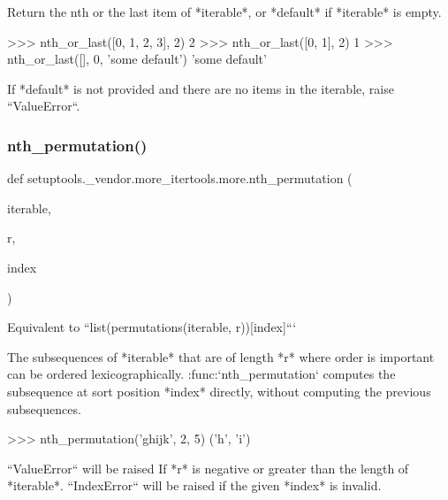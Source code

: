 \begin{DoxyVerb}Return the nth or the last item of *iterable*,
or *default* if *iterable* is empty.

    >>> nth_or_last([0, 1, 2, 3], 2)
    2
    >>> nth_or_last([0, 1], 2)
    1
    >>> nth_or_last([], 0, 'some default')
    'some default'

If *default* is not provided and there are no items in the iterable,
raise ``ValueError``.
\end{DoxyVerb}
 \mbox{\label{namespacesetuptools_1_1__vendor_1_1more__itertools_1_1more_a0d843197e60d5372dec98fceace0ee49}} 
\subsubsection{\texorpdfstring{nth\+\_\+permutation()}{nth\_permutation()}}
{\footnotesize\ttfamily def setuptools.\+\_\+vendor.\+more\+\_\+itertools.\+more.\+nth\+\_\+permutation (\begin{DoxyParamCaption}\item[{}]{iterable,  }\item[{}]{r,  }\item[{}]{index }\end{DoxyParamCaption})}

\begin{DoxyVerb}Equivalent to ``list(permutations(iterable, r))[index]```

The subsequences of *iterable* that are of length *r* where order is
important can be ordered lexicographically. :func:`nth_permutation`
computes the subsequence at sort position *index* directly, without
computing the previous subsequences.

    >>> nth_permutation('ghijk', 2, 5)
    ('h', 'i')

``ValueError`` will be raised If *r* is negative or greater than the length
of *iterable*.
``IndexError`` will be raised if the given *index* is invalid.
\end{DoxyVerb}
 \mbox{\label{namespacesetuptools_1_1__vendor_1_1more__itertools_1_1more_ab5a91cfb58c002e37dcd4efb0c035030}} 
